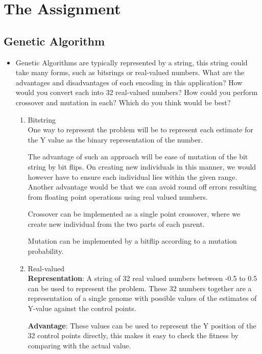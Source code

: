 \documentclass{article}
\begin{document}
\newpage


\newpage
\section{The Assignment}

\subsection{Genetic Algorithm}
\begin{itemize}
	\item Genetic Algorithms are typically represented by a string, this string could take many forms, such as bitsrings or real-valued numbers. What are the advantages and disadvantages of each encoding in this application? How would you convert each into 32 real-valued numbers? How could you perform crossover and mutation in each? Which do you think would be best?
	\begin{enumerate}
		\item Bitstring
		\\\color{blue}
		One way to represent the problem will be to represent each estimate for the Y value as the binary representation of the number. 
		
		The advantage of such an approach will be ease of mutation of the bit string by bit flips. On creating new individuals in this manner, we would however have to ensure each individual lies within the given range. Another advantage would be that we can avoid round off errors resulting from floating point operations using real valued numbers.
		
		Crossover can be implemented as a single point crossover, where we create new individual from the two parts of each parent.
		
		Mutation can be implemented by a bitflip according to a mutation probability.
		
		\color{black}
		\item Real-valued
		\\\color{blue}
		\textbf{Representation}:
		A string of 32 real valued numbers between -0.5 to 0.5 can be used to represent the problem. These 32 numbers together are a representation of a single genome with possible values of the estimates of Y-value against the control points.
		
		\textbf{Advantage}: These values can be used to represent the Y position of the 32 control points directly, this makes it easy to check the fitness by comparing with the actual value.
		

\end{enumerate}
\end{itemize}
\end{document}
